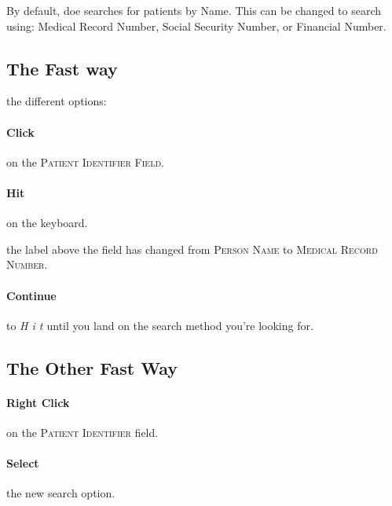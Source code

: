 By default, \gls{doe} searches for patients by Name. This can be changed to search using: Medical Record Number, Social Security Number, or Financial Number.


\subsection{The Fast way}

 the different options:

\paragraph{Click} on the \textsc{Patient Identifier Field.}\\


\paragraph{Hit} {\faKeyboardO}  on the keyboard.\\


 the label above the field has changed from \textsc{Person Name} to \textsc{Medical Record Number.}

\paragraph{Continue} to \textit{ { H i t } } {\faKeyboardO}  until you land on the search method you're looking for.

\subsection{The Other Fast Way}

\paragraph{Right Click} on the \textsc{Patient Identifier} field.\\


\paragraph{Select} the new search option.
